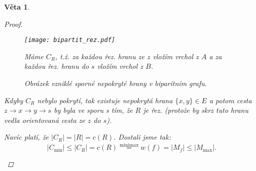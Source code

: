 \documentclass[10pt,a4paper]{article}
\newtheorem{veta}{Věta}
\newcommand\makesmall{\fontsize{8pt}{11pt}\selectfont}
\begin{document}
\begin{veta}
\begin{proof}
\begin{itemize}
        \begin{figure}[h]
            \caption{\makesmall\textit{Obrázek vzniklé sporné nepokryté hrany v biparitním grafu.}}
            \centering
            \texttt{[image: bipartit\_rez.pdf]}

            \makesmall\textit{Máme $C_R$, t.ž. za každou řez. hranu ze $z$ vložím vrchol z $A$ a za každou řez. hranu do $s$ vložím vrchol z $B$.}
        \end{figure}

        Kdyby $C_R$ nebylo pokrytí, tak existuje nepokrytá hrana $\{x,y\}\in E$ a potom cesta $z\to x\to y\to s$ by byla ve sporu s tím, že $R$ je řez. \textit{(protože by skrz tuto hranu vedla orientovaná cesta ze $z$ do $s$).}
        
        Navíc platí, že $|C_R| = |R| = c(R)$. Dostali jsme tak: $$|C_{\min}| \leq |C_R| = c(R) \stackrel{\text{minimax}}{=} w(f) = |M_f| \leq |M_{\max}|.$$
        \end{itemize}
    \end{proof}
\end{veta}
\newpage
\end{document}
